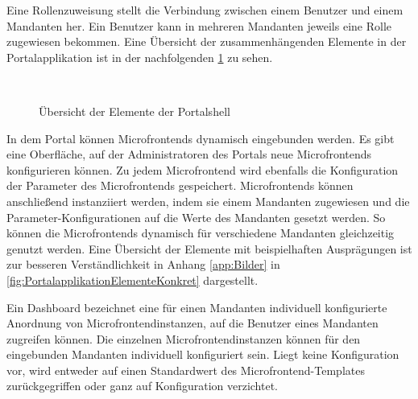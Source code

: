 Eine Rollenzuweisung stellt die Verbindung zwischen einem Benutzer und einem Mandanten her. Ein Benutzer kann in mehreren Mandanten jeweils eine Rolle zugewiesen bekommen. Eine Übersicht der zusammenhängenden Elemente in der Portalapplikation ist in der nachfolgenden \cref{fig:NutzerMandantenDashboard} zu sehen.

\begin{figure}[hbt!]
	\begin{minipage}[t]{1\textwidth}	
		\caption{Übersicht der Elemente der Portalshell}
		\\ %
		\label{fig:NutzerMandantenDashboard}
	\end{minipage}
\end{figure}

In dem Portal können Microfrontends dynamisch eingebunden werden. Es gibt eine Oberfläche, auf der Administratoren des Portals neue Microfrontends konfigurieren können. Zu jedem Microfrontend wird ebenfalls die Konfiguration der Parameter des Microfrontends gespeichert. Microfrontends können anschließend instanziiert werden, indem sie einem Mandanten zugewiesen und die Parameter-Konfigurationen auf die Werte des Mandanten gesetzt werden. So können die Microfrontends dynamisch für verschiedene Mandanten gleichzeitig genutzt werden. Eine Übersicht der Elemente mit beispielhaften Ausprägungen ist zur besseren Verständlichkeit in Anhang \ref{app:Bilder} in \cref{fig:PortalapplikationElementeKonkret} dargestellt.

Ein Dashboard bezeichnet eine für einen Mandanten individuell konfigurierte Anordnung von Microfrontendinstanzen, auf die Benutzer eines Mandanten zugreifen können. Die einzelnen Microfrontendinstanzen können für den eingebunden Mandanten individuell konfiguriert sein. Liegt keine Konfiguration vor, wird entweder auf einen Standardwert des Microfrontend-Templates zurückgegriffen oder ganz auf Konfiguration verzichtet.

